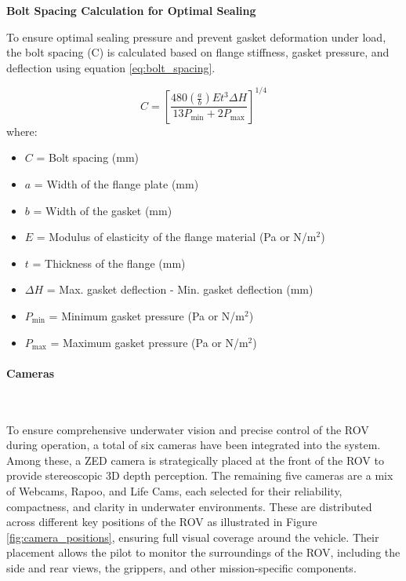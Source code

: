 \textbf{Bolt Spacing Calculation for Optimal Sealing}

To ensure optimal sealing pressure and prevent gasket deformation under load, the bolt spacing (C) is calculated based on flange stiffness, gasket pressure, and deflection using equation \ref{eq:bolt_spacing}.

\begin{equation} \label{eq:bolt_spacing}
    C = \left[ \frac{480 \left( \frac{a}{b} \right) E t^3 \Delta H}{13 P_{\text{min}} + 2 P_{\text{max}}} \right]^{1/4}
    \end{equation}
    where:
    \vspace{-0.5\baselineskip}
    \begin{itemize}
        \setlength{\itemsep}{0pt}
        \item \(C\) = Bolt spacing (mm)
        \item \(a\) = Width of the flange plate (mm)
        \item \(b\) = Width of the gasket (mm)
        \item \(E\) = Modulus of elasticity of the flange material (Pa or N/m\(^2\))
        \item \(t\) = Thickness of the flange (mm)
        \item \(\Delta H\) = Max. gasket deflection - Min. gasket deflection (mm)
        \item \(P_{\text{min}}\) = Minimum gasket pressure (Pa or N/m\(^2\))
        \item \(P_{\text{max}}\) = Maximum gasket pressure (Pa or N/m\(^2\))
    \end{itemize}
    

\vspace{-0.3cm}
\paragraph{Cameras} \ \\
\vspace{-0.5cm}

To ensure comprehensive underwater vision and precise control of the ROV during operation, a total of six cameras have been integrated into the system. Among these, a ZED camera is strategically placed at the front of the ROV to provide stereoscopic 3D depth perception. The remaining five cameras are a mix of Webcams, Rapoo, and Life Cams, each selected for their reliability, compactness, and clarity in underwater environments. These are distributed across different key positions of the ROV as illustrated in Figure \ref{fig:camera_positions}, ensuring full visual coverage around the vehicle. Their placement allows the pilot to monitor the surroundings of the ROV, including the side and rear views, the grippers, and other mission-specific components.

